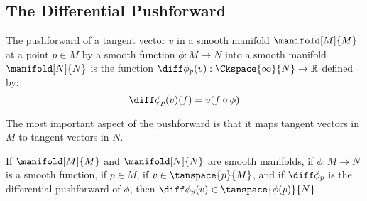     \subsection{The Differential Pushforward}
        \begin{definition}
            The pushforward of a tangent vector $v$ in a smooth manifold
            $\manifold[M]{M}$ at a point $p\in{M}$ by a smooth function
            $\phi:M\rightarrow{N}$ into a smooth manifold $\manifold[N]{N}$
            is the function
            $\diff\phi_{p}(v):\Ckspace{\infty}{N}\rightarrow\mathbb{R}$
            defined by:
            \begin{equation}
                \diff\phi_{p}(v)(f)=v(f\circ\phi)
            \end{equation}
        \end{definition}
        The most important aspect of the pushforward is that it maps tangent
        vectors in $M$ to tangent vectors in $N$.
        \begin{theorem}
            If $\manifold[M]{M}$ and $\manifold[N]{N}$ are smooth manifolds,
            if $\phi:M\rightarrow{N}$ is a smooth function, if $p\in{M}$,
            if $v\in\tanspace{p}{M}$, and if $\diff\phi_{p}$ is the
            differential pushforward of $\phi$, then
            $\diff\phi_{p}(v)\in\tanspace{\phi(p)}{N}$.
        \end{theorem}
